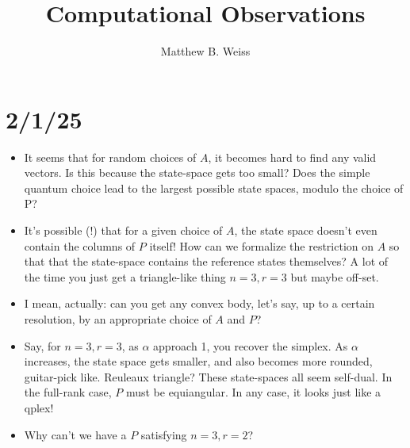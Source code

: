 \documentclass[11pt]{article}
\title{Computational Observations}
\author{Matthew B. Weiss}
\begin{document}
\maketitle

\section{2/1/25}
\begin{itemize}
\item It seems that for random choices of $A$, it becomes hard to find any valid vectors. Is this because the state-space gets too small? Does the simple quantum choice lead to the largest possible state spaces, modulo the choice of P?
\item It's possible (!) that for a given choice of $A$, the state space doesn't even contain the columns of $P$ itself! How can we formalize the restriction on $A$ so that that the state-space contains the reference states themselves? A lot of the time you just get a triangle-like thing $n=3, r=3$ but maybe off-set.
\item I mean, actually: can you get any convex body, let's say, up to a certain resolution, by an appropriate choice of $A$ and $P$?
\item Say, for $n=3, r=3$, as $\alpha$ approach 1, you recover the simplex. As $\alpha$ increases, the state space gets smaller, and also becomes more rounded, guitar-pick like. Reuleaux triangle? These state-spaces all seem self-dual. In the full-rank case, $P$ must be equiangular. In any case, it looks just like a qplex!
\item Why can't we have a $P$ satisfying $n=3, r=2$?
\end{itemize}
\end{document}
